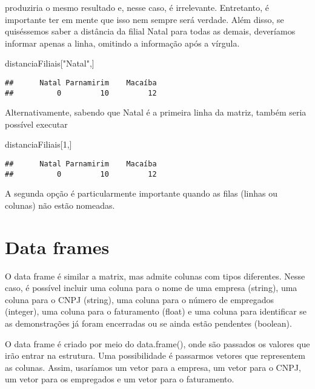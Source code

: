 \documentclass[
]{book}
\newenvironment{Shaded}{\begin{snugshade}}{\end{snugshade}}
\newcommand{\DecValTok}[1]{\textcolor[rgb]{0.00,0.00,0.81}{#1}}
\newcommand{\NormalTok}[1]{#1}
\newcommand{\StringTok}[1]{\textcolor[rgb]{0.31,0.60,0.02}{#1}}
\begin{document}
produziria o mesmo resultado e, nesse caso, é irrelevante. Entretanto, é importante ter em mente que isso nem sempre será verdade. Além disso, se quiséssemos saber a distância da filial Natal para todas as demais, deveríamos informar apenas a linha, omitindo a informação após a vírgula.

\begin{Shaded}
\begin{Highlighting}[]
\NormalTok{distanciaFiliais[}\StringTok{"Natal"}\NormalTok{,]}
\end{Highlighting}
\end{Shaded}

\begin{verbatim}
##      Natal Parnamirim    Macaíba 
##          0         10         12
\end{verbatim}

Alternativamente, sabendo que Natal é a primeira linha da matriz, também seria possível executar

\begin{Shaded}
\begin{Highlighting}[]
\NormalTok{distanciaFiliais[}\DecValTok{1}\NormalTok{,]}
\end{Highlighting}
\end{Shaded}

\begin{verbatim}
##      Natal Parnamirim    Macaíba 
##          0         10         12
\end{verbatim}

A segunda opção é particularmente importante quando as filas (linhas ou colunas) não estão nomeadas.

\hypertarget{data-frames}{%
\section{Data frames}\label{data-frames}}

O data frame é similar a matrix, mas admite colunas com tipos diferentes. Nesse caso, é possível incluir uma coluna para o nome de uma empresa (string), uma coluna para o CNPJ (string), uma coluna para o número de empregados (integer), uma coluna para o faturamento (float) e uma coluna para identificar se as demonstrações já foram encerradas ou se ainda estão pendentes (boolean).

O data frame é criado por meio do data.frame(), onde são passados os valores que irão entrar na estrutura. Uma possibilidade é passarmos vetores que representem as colunas. Assim, usaríamos um vetor para a empresa, um vetor para o CNPJ, um vetor para os empregados e um vetor para o faturamento.
\end{document}
